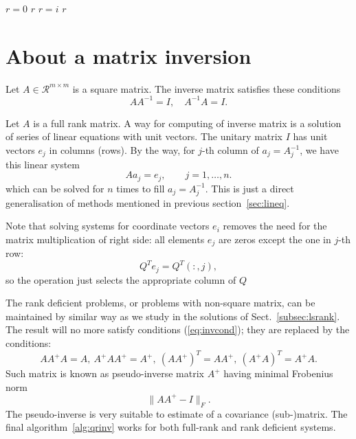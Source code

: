\begin{refsection}
\begin{algorithm}
  \caption{Determine rank of a matrix}
  \label{alg:rank}
  \begin{algorithmic}
    \State {}
    \State $r = 0$
    \State \Return $r$
    \EndIf
    \State $r = i$
    \EndFor
    \State \Return $r$
    \EndFunction
  \end{algorithmic}
\end{algorithm}

\section{About a matrix inversion}

Let $A \in \mathcal{R}^{m \times m}$ is a square matrix. The inverse matrix
satisfies these conditions
\begin{equation}
  \label{eq:invcond}
  A A^{-1} = I, \quad A^{-1} A = I.
\end{equation}

Let $A$ is a full rank matrix. A way for computing of inverse matrix
is a solution of series of linear equations with unit vectors.
The unitary matrix $I$ has unit vectors $e_j$ in columns (rows).
By the way, for $j$-th column of $a_j = A_j^{-1}$, we have this linear
system
\[
A a_j = e_j, \qquad j=1, \ldots, n.
\]
which can be solved for $n$ times to fill $a_j = A_j^{-1}$.
This is just a direct generalisation of methods mentioned in
previous section~\ref{sec:lineq}.

Note that solving systems for coordinate vectors $e_i$ removes the need for
the matrix multiplication of right side:
all elements $e_j$ are zeros except the one in $j$-th row:
\[
Q^T e_j = Q^T(:,j),
\]
so the operation just selects the appropriate column of $Q$

The rank deficient problems, or problems with non-square matrix,
can be maintained by similar way as we study in the solutions
of Sect.~\ref{subsec:lsrank}.
The result will no more satisfy conditions (\ref{eq:invcond});
they are replaced by the conditions:
\[
A A^+ A = A, \ A^+ A A^+ = A^+, \  (A A^+)^T = A A^+, \ (A^+ A)^T = A^+ A.
\]
Such matrix is known as pseudo-inverse matrix
$A^+$ having minimal Frobenius norm
\[
\lVert A A^+ - I \rVert_F.
\]
The pseudo-inverse is very suitable to estimate of
a covariance (sub-)matrix.
The final algorithm~\ref{alg:qrinv} works for both full-rank
and rank deficient systems.


\end{refsection}
